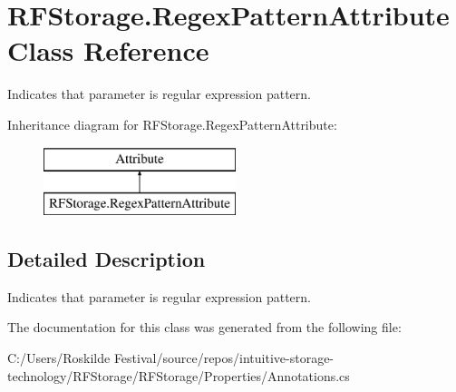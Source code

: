 \hypertarget{class_r_f_storage_1_1_regex_pattern_attribute}{}\section{R\+F\+Storage.\+Regex\+Pattern\+Attribute Class Reference}
\label{class_r_f_storage_1_1_regex_pattern_attribute}


Indicates that parameter is regular expression pattern.  


Inheritance diagram for R\+F\+Storage.\+Regex\+Pattern\+Attribute\+:\begin{figure}[H]
\begin{center}
\leavevmode
\includegraphics[height=2.000000cm]{class_r_f_storage_1_1_regex_pattern_attribute}
\end{center}
\end{figure}


\subsection{Detailed Description}
Indicates that parameter is regular expression pattern. 



The documentation for this class was generated from the following file\+:\begin{DoxyCompactItemize}
\item 
C\+:/\+Users/\+Roskilde Festival/source/repos/intuitive-\/storage-\/technology/\+R\+F\+Storage/\+R\+F\+Storage/\+Properties/Annotations.\+cs\end{DoxyCompactItemize}
